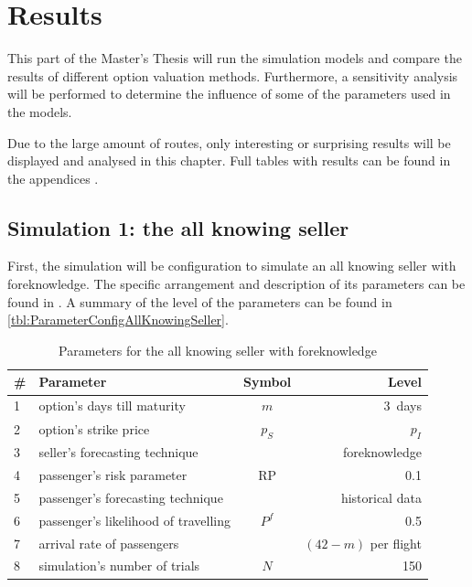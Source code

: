 \chapter{Results}
This part of the Master's Thesis will run the simulation models and compare the results of different option valuation methods. Furthermore, a sensitivity analysis will be performed to determine the influence of some of the parameters used in the models.

Due to the large amount of routes, only interesting or surprising results will be displayed and analysed in this chapter. Full tables with results can be found in the appendices .


\section{Simulation 1: the all knowing seller}
First, the simulation will be configuration to simulate an all knowing seller with foreknowledge. The specific arrangement and description of its parameters can be found in . A summary of the level of the parameters can be found in \autoref{tbl:ParameterConfigAllKnowingSeller}.


\begin{table}
\begin{center}
\begin{tabular}{l l c r}
    \toprule
    \#  & Parameter  &  Symbol  &  Level \\
    \midrule
    1  &  option's days till maturity  &  $m$  & 3~days \\
    2  &  option's strike price  &  $p_S$  &  $p_I$  \\
    3  &  seller's forecasting technique  &  ~  & foreknowledge \\
    4  &  passenger's risk parameter  &  $\mbox{RP}$  &  0.1 \\ 
    5  &  passenger's forecasting technique  &  ~  &  historical data \\
    6  &  passenger's likelihood of travelling  &  $P^f$  &  0.5 \\
    7  &  arrival rate of passengers  &  ~  &  $(42 - m)$ per flight \\
    8  &  simulation's number of trials  &  $N$  &  150 \\
    \bottomrule
\end{tabular}
\caption{Parameters for the all knowing seller with foreknowledge}
\label{tbl:ParameterConfigAllKnowingSeller}
\end{center}
\end{table}


